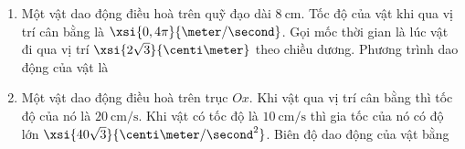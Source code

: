 \begin{enumerate}[label=\bfseries Câu \arabic*:]
\item Một vật dao động điều hoà trên quỹ đạo dài $\SI{8}{\centi\meter}$. Tốc độ của vật khi qua vị trí cân bằng là $\xsi{0,4\pi}{\meter/\second}$. Gọi mốc thời gian là lúc vật đi qua vị trí $\xsi{2\sqrt{3}}{\centi\meter}$ theo chiều dương. Phương trình dao động của vật là

\item Một vật dao động điều hoà trên trục $Ox$. Khi vật qua vị trí cân bằng thì tốc độ của nó là $\SI{20}{\centi\meter/\second}$. Khi vật có tốc độ là $\SI{10}{\centi\meter/\second}$ thì gia tốc của nó có độ lớn $\xsi{40\sqrt{3}}{\centi\meter/\second^2}$. Biên độ dao động của vật bằng


\end{enumerate}
